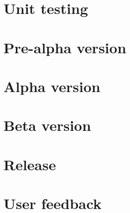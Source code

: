 \section{Unit testing}

\section{Pre-alpha version}

\section{Alpha version}

\section{Beta version}

\section{Release}

\section{User feedback}